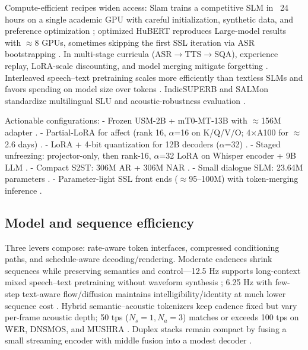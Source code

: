 \documentclass{article}
\begin{document}
Compute-efficient recipes widen access: Slam trains a competitive SLM in ~24 hours on a single academic GPU with careful initialization, synthetic data, and preference optimization \cite{maimon2025slammingtrainingspeechlanguagemodelonegp}; optimized HuBERT reproduces Large-model results with $\approx$8 GPUs, sometimes skipping the first SSL iteration via ASR bootstrapping \cite{chen2023reducingbarriersselfsupervisedlearninghu}. In multi-stage curricula (ASR$\rightarrow$TTS$\rightarrow$SQA), experience replay, LoRA-scale discounting, and model merging mitigate forgetting \cite{hsiao2025analyzingmitigationstrategiescatastrophi}. Interleaved speech--text pretraining scales more efficiently than textless SLMs and favors spending on model size over tokens \cite{maimon2025scalinganalysisinterleavedspeechtextlang}. IndicSUPERB and SALMon standardize multilingual SLU and acoustic-robustness evaluation \cite{entry2025indicsuperbspeechprocessinguniversalperf,maimon2025salmonsuiteacousticlanguagemodelevaluati}.

Actionable configurations:
- Frozen USM-2B + mT0-MT-13B with $\approx$156M adapter \cite{wang2023slmbridgethingapbetweenspeechtextfoundat}.
- Partial-LoRA for affect (rank 16, $\alpha$=16 on K/Q/V/O; 4$\times$A100 for $\approx$2.6 days) \cite{wang2024blspemotowardsempatheticlargespeechlangu}.
- LoRA + 4-bit quantization for 12B decoders ($\alpha$=32) \cite{nguyen2025qwenvsgemmaintegrationwhispercomparative}.
- Staged unfreezing: projector-only, then rank-16, $\alpha$=32 LoRA on Whisper encoder + 9B LLM \cite{li2025seewossubmissionmlcslmlessonslearnedspee}.
- Compact S2ST: 306M AR + 306M NAR \cite{peng2024mslms2stmultitaskspeechlanguagemodeltext}.
- Small dialogue SLM: 23.64M parameters \cite{nakata2024jchatjapaneselargescalespokendialoguecor}.
- Parameter-light SSL front ends ($\approx$95--100M) with token-merging inference \cite{chen2023reducingbarriersselfsupervisedlearninghu,lu2024fastadaspmultitaskadaptedefficientinfere,maimon2025scalinganalysisinterleavedspeechtextlang}.

\subsection{Model and sequence efficiency} \label{subsec:Model and sequence efficiency}
Three levers compose: rate-aware token interfaces, compressed conditioning paths, and schedule-aware decoding/rendering. Moderate cadences shrink sequences while preserving semantics and control---12.5 Hz supports long-context mixed speech--text pretraining without waveform synthesis \cite{zeng2024scalingspeechtextpretrainingsyntheticint}; 6.25 Hz with few-step text-aware flow/diffusion maintains intelligibility/identity at much lower sequence cost \cite{wang2025tadicodectextawarediffusionspeechtokeniz}. Hybrid semantic--acoustic tokenizers keep cadence fixed but vary per-frame acoustic depth; 50 tps ($N_{s}=1, N_{a}=3$) matches or exceeds 100 tps on WER, DNSMOS, and MUSHRA \cite{yang2025diffsoundstreamefficientspeechtokenizati}. Duplex stacks remain compact by fusing a small streaming encoder with middle fusion into a modest decoder \cite{ma2024languagemodelcanlistenwhilespeaking}.
\end{document}
